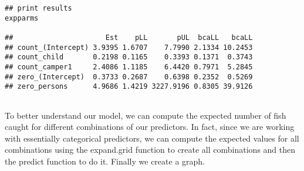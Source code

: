 \documentclass[MASTER.tex]{subfiles}
\begin{document}
\begin{frame}[fragile]
\begin{verbatim}
## print results
expparms
 
##                      Est    pLL       pUL  bcaLL   bcaLL
## count_(Intercept) 3.9395 1.6707    7.7990 2.1334 10.2453
## count_child       0.2198 0.1165    0.3393 0.1371  0.3743
## count_camper1     2.4086 1.1185    6.4420 0.7971  5.2845
## zero_(Intercept)  0.3733 0.2687    0.6398 0.2352  0.5269
## zero_persons      4.9686 1.4219 3227.9196 0.8305 39.9126
 
\end{verbatim}
\end{frame}
\begin{frame}[fragile]

To better understand our model, we can compute the expected number of fish caught for different combinations of our predictors. In fact, since we are working with essentially categorical predictors, we can compute the expected values for all combinations using the expand.grid function to create all combinations and then the predict function to do it. Finally we create a graph.
\end{frame}

 
% 
\end{document}

